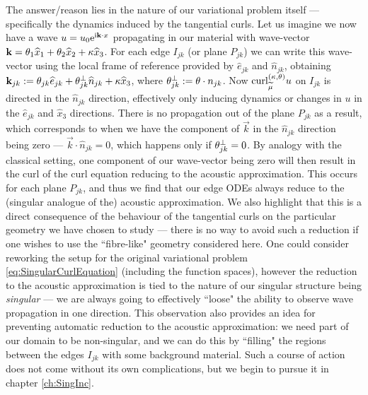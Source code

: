 The answer/reason lies in the nature of our variational problem itself --- specifically the dynamics induced by the tangential curls.
Let us imagine we now have a wave $u = u_0\mathrm{e}^{\mathrm{i}\mathbf{k}\cdot x}$ propagating in our material with wave-vector $\mathbf{k} = \theta_1\widehat{x}_1 + \theta_2\widehat{x}_2 + \kappa\widehat{x}_3$.
For each edge $I_{jk}$ (or plane $P_{jk}$) we can write this wave-vector using the local frame of reference provided by $\widehat{e}_{jk}$ and $\widehat{n}_{jk}$, obtaining $\mathbf{k}_{jk} := \theta_{jk}\widehat{e}_{jk} + \theta_{jk}^\perp\widehat{n}_{jk} + \kappa\widehat{x}_3$, where $\theta_{jk}^\perp := \theta\cdot n_{jk}$.
Now $\mathrm{curl}_{\widetilde{\mu}}^{\left( \kappa, \theta \right)}u$ on $I_{jk}$ is directed in the $\widehat{n}_{jk}$ direction, effectively only inducing dynamics or changes in $u$ in the $\widehat{e}_{jk}$ and $\widehat{x}_3$ directions.
There is no propagation out of the plane $P_{jk}$ as a result, which corresponds to when we have the component of $\vec{k}$ in the $\widehat{n}_{jk}$ direction being zero --- $\vec{k}\cdot\widehat{n}_{jk}=0$, which happens only if $\theta_{jk}^\perp=0$.
By analogy with the classical setting, one component of our wave-vector being zero will then result in the curl of the curl equation reducing to the acoustic approximation.
This occurs for each plane $P_{jk}$, and thus we find that our edge ODEs always reduce to the (singular analogue of the) acoustic approximation.
We also highlight that this is a direct consequence of the behaviour of the tangential curls on the particular geometry we have chosen to study --- there is no way to avoid such a reduction if one wishes to use the ``fibre-like" geometry considered here.
One could consider reworking the setup for the original variational problem \eqref{eq:SingularCurlEquation} (including the function spaces), however the reduction to the acoustic approximation is tied to the nature of our singular structure being \emph{singular} --- we are always going to effectively ``loose" the ability to observe wave propagation in one direction.
This observation also provides an idea for preventing automatic reduction to the acoustic approximation:  we need part of our domain to be non-singular, and we can do this by ``filling" the regions between the edges $I_{jk}$ with some background material.
Such a course of action does not come without its own complications, but we begin to pursue it in chapter \ref{ch:SingInc}.

